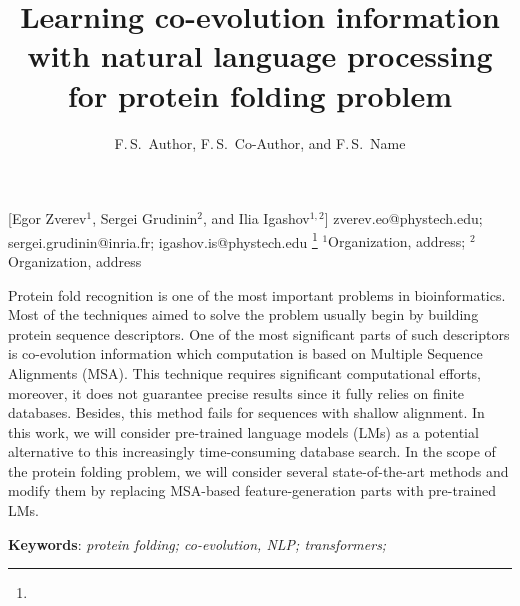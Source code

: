 \documentclass[12pt, twoside]{article}
\begin{document}
\English

\title
	[] %
    { Learning co-evolution information with natural language processing for protein folding problem} %
\author
	[F.\,S.~Author] %
	{F.\,S.~Author, F.\,S.~Co-Author, and F.\,S.~Name} %
    [Egor Zverev$^1$, Sergei Grudinin$^2$, and Ilia Igashov$^{1, 2}$] %
\email
    {zverev.eo@phystech.edu; sergei.grudinin@inria.fr; igashov.is@phystech.edu}
\thanks
    {}
\organization
    {$^1$Organization, address;
     $^2$Organization, address}
\abstract
    {Protein fold recognition is one of the most important problems in bioinformatics. Most of the techniques aimed to solve the problem usually begin by building protein sequence descriptors. One of the most significant parts of such descriptors is co-evolution information which computation is based on Multiple Sequence Alignments (MSA). This technique requires significant computational efforts, moreover, it does not guarantee precise results since it fully relies on finite databases. Besides, this method fails for sequences with shallow alignment. In this work, we will consider pre-trained language models (LMs)  as a potential alternative to this increasingly time-consuming database search.  In the scope of the protein folding problem, we will  consider  several  state-of-the-art  methods  and  modify  them  by  replacing  MSA-based  feature-generation parts with pre-trained LMs.

		
	\noindent
    	\textbf{Keywords}: \emph{protein folding; co-evolution, NLP; transformers; }}





\maketitle
\linenumbers
\end{document}
